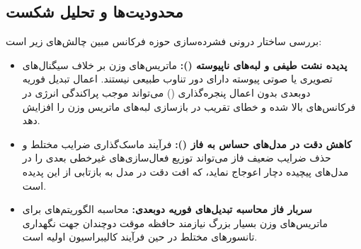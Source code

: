 \subsection{محدودیت‌ها و تحلیل شکست}
بررسی ساختار درونی فشرده‌سازی حوزه فرکانس مبین چالش‌های زیر است:
\begin{itemize}
    \item \textbf{پدیده نشت طیفی و لبه‌های ناپیوسته ():} ماتریس‌های وزن بر خلاف سیگنال‌های تصویری یا صوتی پیوسته دارای دور تناوب طبیعی نیستند. اعمال تبدیل فوریه دو‌بعدی بدون اعمال پنجره‌گذاری () می‌تواند موجب پراکندگی انرژی در فرکانس‌های بالا شده و خطای تقریب در بازسازی لبه‌های ماتریس وزن را افزایش دهد.
    \item \textbf{کاهش دقت در مدل‌های حساس به فاز ():} فرآیند ماسک‌گذاری ضرایب مختلط و حذف ضرایب ضعیف فاز می‌تواند توزیع فعال‌سازی‌های غیرخطی بعدی را در مدل‌های پیچیده دچار اعوجاج نماید، که افت دقت در مدل  به  بازتابی از این پدیده است.
    \item \textbf{سربار فاز محاسبه تبدیل‌های فوریه دو‌بعدی:} محاسبه الگوریتم‌های  برای ماتریس‌های وزن بسیار بزرگ نیازمند حافظه موقت دوچندان جهت نگهداری تانسورهای مختلط  در حین فرآیند کالیبراسیون اولیه است.
\end{itemize}
